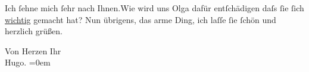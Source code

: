 \pstart
           Ich{ }ſehne mich{ }ſehr {\pb}nach
                  Ihnen.\hspace*{1.5em}Wie wird uns Olga dafür entſchädigen daſs{ }ſie{ }ſich \uline{wichtig} gemacht hat? Nun übrigens, das arme Ding, ich laſſe{ }ſie{ }ſchön
               und herzlich grüßen.\pend
           
\pstart
           Von Herzen Ihr{\\[\baselineskip]}\spacefill\mbox{Hugo.}\pend
           \leftskip=0em{}\endnumbering{}  \newcommand{\dateiname}{L01753}\newcommand{\titel}{Hugo von Hofmannsthal an Arthur Schnitzler, [17. 1. 1908]}\newcommand{\editorInnen}{Martin Anton Müller und Gerd-Hermann Susen}
